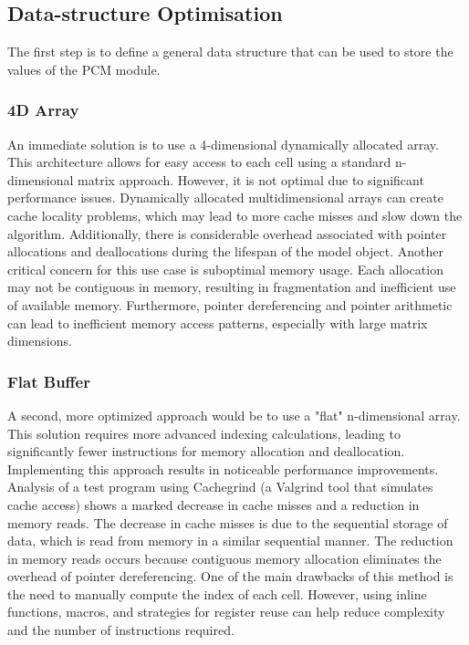 \subsection{Data-structure Optimisation}\label{sec:data_opt}
The first step is to define a general data structure that can be used to store the values of the PCM module.

\subsubsection{4D Array}\label{sec:4d_array}
An immediate solution is to use a 4-dimensional dynamically allocated array. This architecture allows for easy access to each cell using a standard n-dimensional matrix approach. However, it is not optimal due to significant performance issues.
Dynamically allocated multidimensional arrays can create cache locality problems, which may lead to more cache misses and slow down the algorithm. Additionally, there is considerable overhead associated with pointer allocations and deallocations during the lifespan of the model object.
Another critical concern for this use case is suboptimal memory usage. Each allocation may not be contiguous in memory, resulting in fragmentation and inefficient use of available memory. Furthermore, pointer dereferencing and pointer arithmetic can lead to inefficient memory access patterns, especially with large matrix dimensions.

\subsubsection{Flat Buffer}\label{sec:flat_buf}
A second, more optimized approach would be to use a "flat" n-dimensional array. This solution requires more advanced indexing calculations, leading to significantly fewer instructions for memory allocation and deallocation. Implementing this approach results in noticeable performance improvements. 
Analysis of a test program using Cachegrind (a Valgrind tool that simulates cache access) shows a marked decrease in cache misses and a reduction in memory reads. The decrease in cache misses is due to the sequential storage of data, which is read from memory in a similar sequential manner. The reduction in memory reads occurs because contiguous memory allocation eliminates the overhead of pointer dereferencing.
One of the main drawbacks of this method is the need to manually compute the index of each cell. However, using inline functions, macros, and strategies for register reuse can help reduce complexity and the number of instructions required.

